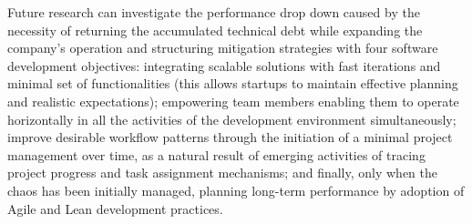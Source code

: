 \documentclass[10pt,journal,letterpaper,compsoc]{IEEEtran}
\begin{document}
Future research can investigate the performance drop down caused by the
necessity of returning the accumulated technical debt while expanding the
company's operation and structuring mitigation strategies with four software
development objectives: integrating scalable solutions with fast iterations and
minimal set of functionalities (this allows startups to maintain effective
planning and realistic expectations); empowering team members enabling them to
operate horizontally in all the activities of the development environment
simultaneously; improve desirable workflow patterns through the initiation of a
minimal project management over time, as a natural result of emerging activities
of tracing project progress and task assignment mechanisms; and finally, only
when the chaos has been initially managed, planning long-term performance by
adoption of Agile and Lean development practices.



\end{document}
